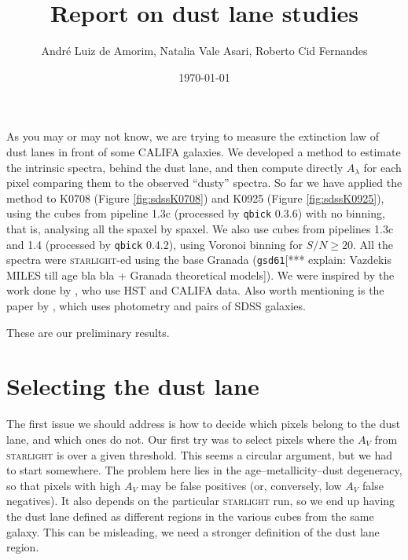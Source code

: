 \documentclass[a4paper]{article}
\author{André Luiz de Amorim, Natalia Vale Asari, Roberto Cid Fernandes}
\date{\today}
\title{Report on dust lane studies}
\def\starlight{\textsc{starlight}\xspace}
\def\qbick{\texttt{qbick}\xspace}
\def\gsd{\texttt{gsd61}\xspace}
\begin{document}
\maketitle

As you may or may not know, we are trying to measure the extinction
law of dust lanes in front of some CALIFA galaxies. We developed a
method to estimate the intrinsic spectra, behind the dust lane, and
then compute directly $A_\lambda$ for each pixel comparing them to the
observed ``dusty'' spectra. So far we have applied the method to K0708
(Figure \ref{fig:sdssK0708}) and K0925 (Figure \ref{fig:sdssK0925}),
using the cubes from pipeline 1.3c (processed by \qbick 0.3.6) with no
binning, that is, analysing all the spaxel by spaxel. We also use
cubes from pipelines 1.3c and 1.4 (processed by \qbick 0.4.2), using
Voronoi binning for $S/N \geq 20$. All the spectra were \starlight-ed
using the base Granada (\gsd [*** explain: Vazdekis MILES till age bla
bla + Granada theoretical models]).  We were inspired by the work done by
\citet{Holwerda2013}, who use HST and CALIFA data. Also worth
mentioning is the paper by \citet{Wild2011}, which uses photometry and
pairs of SDSS galaxies.

These are our preliminary results.


\section{Selecting the dust lane}

The first issue we should address is how to decide which pixels belong to the
dust lane, and which ones do not. Our first try was to select pixels where the
$A_V$ from \starlight is over a given threshold. This seems a circular argument,
but we had to start somewhere. The problem here lies in the
age--metallicity--dust degeneracy, so that pixels with high $A_V$ may be false
positives (or, conversely, low $A_V$ false negatives). It also depends on the
particular \starlight run, so we end up having the dust lane defined as
different regions in the various cubes from the same galaxy. This can be
misleading, we need a stronger definition of the dust lane region.
\end{document}
